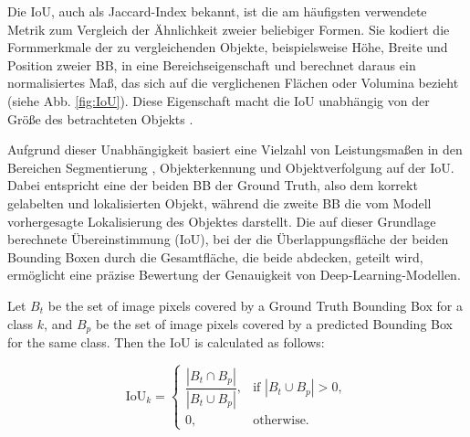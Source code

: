 Die \acrfull{IoU}, auch als Jaccard-Index bekannt, ist die am häufigsten verwendete Metrik zum Vergleich der Ähnlichkeit zweier beliebiger Formen. Sie kodiert die Formmerkmale der zu vergleichenden Objekte, beispielsweise Höhe, Breite und Position zweier \acrshort{BB}, in eine Bereichseigenschaft und berechnet daraus ein normalisiertes Maß, das sich auf die verglichenen Flächen oder Volumina bezieht (siehe Abb. \ref{fig:IoU}). Diese Eigenschaft macht die \acrshort{IoU} unabhängig von der Größe des betrachteten Objekts \cite{Rezatofighi2019}.

Aufgrund dieser Unabhängigkeit basiert eine Vielzahl von Leistungsmaßen in den Bereichen Segmentierung \cite{Ramirez2019,cordts2016,Zhou2017,lin2015}, Objekterkennung \cite{lin2015,Everingham2010} und Objektverfolgung \cite{Kristan2016,lealtaixé2015} auf der \acrshort{IoU}. Dabei entspricht eine der beiden \acrshort{BB} der Ground Truth, also dem korrekt gelabelten und lokalisierten Objekt, während die zweite \acrshort{BB} die vom Modell vorhergesagte Lokalisierung des Objektes darstellt. Die auf dieser Grundlage berechnete Übereinstimmung (\acrshort{IoU}), bei der die Überlappungsfläche der beiden Bounding Boxen durch die Gesamtfläche, die beide abdecken, geteilt wird, ermöglicht eine präzise Bewertung der Genauigkeit von Deep-Learning-Modellen.
\begin{definition}
    Let $B_t$ be the set of image pixels covered by a Ground Truth Bounding Box for a class $k$, 
    and $B_p$ be the set of image pixels covered by a predicted Bounding Box for the same class. 
    Then the IoU is calculated as follows:

    \begin{equation}
    \text{IoU}_k =
    \begin{cases}
        \dfrac{|B_t \cap B_p|}{|B_t \cup B_p|}, & \text{if } |B_t \cup B_p| > 0, \\[6pt]
        0, & \text{otherwise.}
    \end{cases}
    \end{equation}

\end{definition}

